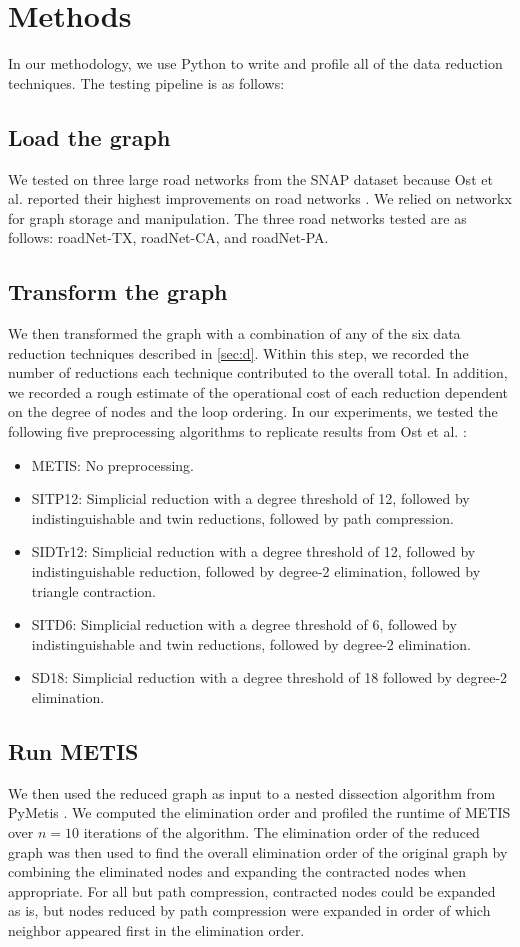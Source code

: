 \documentclass[final]{siamart250211}
\begin{document}
\section{Methods}
\label{sec:methods}
In our methodology, we use Python to write and profile all of the data reduction techniques. The testing pipeline is as follows:
\subsection{Load the graph} We tested on three large road networks from the SNAP dataset \cite{snapnets} because Ost et al. reported their highest improvements on road networks \cite{OsScSt20}. We relied on networkx \cite{HaScSw08} for graph storage and manipulation. The three road networks tested are as follows: roadNet-TX, roadNet-CA, and roadNet-PA.
\subsection{Transform the graph} We then transformed the graph with a combination of any of the six data reduction techniques described in \cref{sec:d}. Within this step, we recorded the number of reductions each technique contributed to the overall total. In addition, we recorded a rough estimate of the operational cost of each reduction dependent on the degree of nodes and the loop ordering. In our experiments, we tested the following five preprocessing algorithms to replicate results from Ost et al. \cite{OsScSt20}:
\begin{itemize}
    \item METIS: No preprocessing.
    \item SITP12: Simplicial reduction with a degree threshold of 12, followed by indistinguishable and twin reductions, followed by path compression.
    \item SIDTr12: Simplicial reduction with a degree threshold of 12, followed by indistinguishable reduction, followed by degree-2 elimination, followed by triangle contraction.
    \item SITD6: Simplicial reduction with a degree threshold of 6, followed by indistinguishable and twin reductions, followed by degree-2 elimination.
    \item SD18: Simplicial reduction with a degree threshold of 18 followed by degree-2 elimination.
\end{itemize}


\subsection{Run METIS} We then used the reduced graph as input to a nested dissection algorithm from PyMetis \cite{PyMetis2022}. We computed the elimination order and profiled the runtime of METIS over $n=10$ iterations of the algorithm. The elimination order of the reduced graph was then used to find the overall elimination order of the original graph by combining the eliminated nodes and expanding the contracted nodes when appropriate. For all but path compression, contracted nodes could be expanded as is, but nodes reduced by path compression were expanded in order of which neighbor appeared first in the elimination order.
\end{document}

